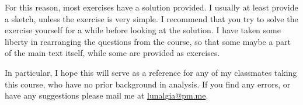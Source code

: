 For this reason, most exercises have a solution provided. I usually at least provide a sketch,
unless the exercise is very simple. I recommend that you try to solve the exercise yourself
for a while before looking at the solution. I have taken some liberty in rearranging the
questions from the course, so that some maybe a part of the main text itself, while some
are provided as exercises.

In particular, I hope this will serve as a reference for any of my classmates taking this course,
who have no prior background in analysis. If you find any errors, or have any
suggestions please mail me at \href{mailto:lunalgia@pm.me}{lunalgia@pm.me}.
